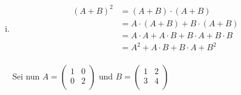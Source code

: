 \documentclass{article}
\begin{document}
\begin{enumerate}[(i)]
\item
  \begin{align*}
    (A + B)^2 &= (A + B) \cdot (A + B) \\
              &= A \cdot  (A + B) + B \cdot (A + B) \\
              &= A \cdot A + A \cdot B + B \cdot A + B \cdot B \\
              &= A^2 + A \cdot B + B \cdot A + B^2 \\
  \end{align*}
  
  Sei nun $A = \left(\begin{array}{cc}1 & 0 \\ 0 & 2 \\ \end{array}\right)$ und
  $B = \left(\begin{array}{cc}1 & 2 \\ 3 & 4 \\ \end{array}\right)$


\end{enumerate}
\end{document}
